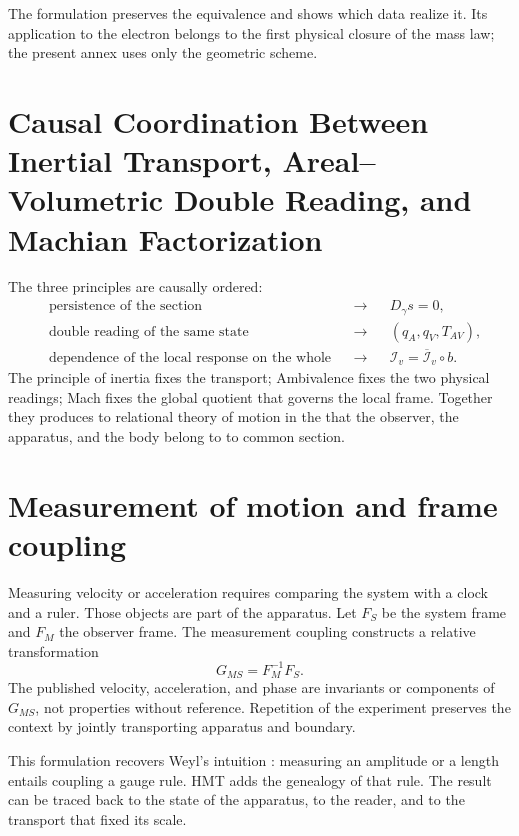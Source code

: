 The formulation preserves the equivalence and shows which data realize it. Its
application to the electron belongs to the first physical closure of the mass
law; the present annex uses only the geometric scheme.

\section{Causal Coordination Between Inertial Transport, Areal–Volumetric Double Reading, and Machian Factorization}

The three principles are causally ordered:
\begin{equation}
 \boxed{
 \begin{aligned}
 &\text{persistence of the section}
   &&\longrightarrow&& D_\gamma s=0,\\
 &\text{double reading of the same state}
   &&\longrightarrow&& (q_A,q_V,T_{AV}),\\
 &\text{dependence of the local response on the whole}
   &&\longrightarrow&& \mathcal I_v=\overline{\mathcal I}_v\circ b.
 \end{aligned}}
 \label{eq:triptico-inercia-mach}
\end{equation}
The principle of inertia fixes the transport; Ambivalence fixes the two
physical readings; Mach fixes the global quotient that governs the local frame.
Together they produces to relational theory of motion in the that the observer,
the apparatus, and the body belong to to common section.

\section{Measurement of motion and frame coupling}

Measuring velocity or acceleration requires comparing the system with a clock and a
ruler. Those objects are part of the apparatus. Let \(F_S\) be the system frame
and \(F_M\) the observer frame. The measurement coupling constructs a
relative transformation
\[
 G_{MS}=F_M^{-1}F_S.
\]
The published velocity, acceleration, and phase are invariants or
components of \(G_{MS}\), not properties without reference. Repetition of the
experiment preserves the context by jointly transporting apparatus and
boundary.

This formulation recovers Weyl's intuition \cite{Weyl1927}: measuring an amplitude or a
length entails coupling a gauge rule. HMT adds the genealogy of that
rule. The result can be traced back to the state of the apparatus, to the reader, and to the
transport that fixed its scale.

